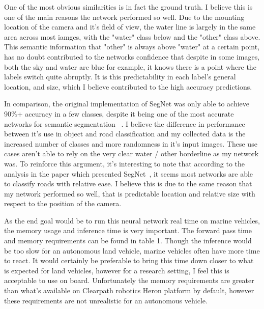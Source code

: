 \documentclass[10pt,twocolumn,letterpaper]{article}
\begin{document}
One of the most obvious similarities is in fact the ground truth. I believe this is one of the main reasons the network performed so well. Due to the mounting location of the camera and it's field of view, the water line is largely in the same area across most iamges, with the "water" class below and the "other" class above. This semantic information that "other" is always above "water" at a certain point, has no doubt contributed to the networks confidence that despite in some images, both the sky and water are blue for example, it knows there is a point where the labels switch quite abruptly. It is this predictability in each label's general location, and size, which I believe contributed to the high accuracy predictions.

In comparison, the original implementation of SegNet was only able to achieve 90\%+ accuracy in a few classes, despite it being one of the most accurate networks for semantic segmentation ~\cite{DBLP:journals/corr/BadrinarayananK15}. I believe the difference in performance between it's use in object and road classification and my collected data is the increased number of classes and more randomness in it's input images. These use cases aren't able to rely on the very clear water / other borderline as my network was. To reinforce this argument, it's interesting to note that according to the analysis in the paper which presented SegNet~\cite{DBLP:journals/corr/BadrinarayananK15}, it seems most networks are able to classify roads with relative ease. I believe this is due to the same reason that my network performed so well, that is predictable location and relative size with respect to the position of the camera.

As the end goal would be to run this neural network real time on marine vehicles, the memory usage and inference time is very important. The forward pass time and memory requirements can be found in table 1. Though the inference would be too slow for an autonomous land vehicle, marine vehicles often have more time to react. It would certainly be preferable to bring this time down closer to what is expected for land vehicles, however for a research setting, I feel this is acceptable to use on board. Unfortunately the memory requirements are greater than what's available on Clearpath robotics Heron platform by default, however these requirements are not unrealistic for an autonomous vehicle. 


\end{document}
